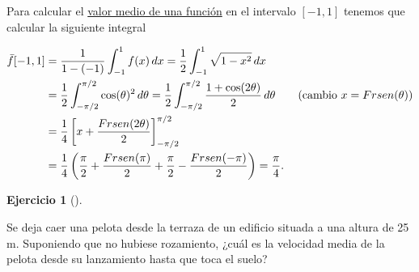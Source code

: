 \documentclass[
  spanish,
  a4paper,
]{scrreport}
\theoremstyle{definition}
\newtheorem{exercise}{Ejercicio}[chapter]
\theoremstyle{remark}
\begin{document}
\begin{tcolorbox}[enhanced jigsaw, arc=.35mm, bottomrule=.15mm, bottomtitle=1mm, breakable, colback=white, colbacktitle=quarto-callout-tip-color!10!white, colframe=quarto-callout-tip-color-frame, coltitle=black, left=2mm, leftrule=.75mm, opacityback=0, opacitybacktitle=0.6, rightrule=.15mm, title=\textcolor{quarto-callout-tip-color}{\faLightbulb}\hspace{0.5em}{Solución}, titlerule=0mm, toprule=.15mm, toptitle=1mm]

Para calcular el
\href{https://aprendeconalf.es/analisis-manual/08-integrales.html\#c\%C3\%A1lculo-de-la-media-de-una-funci\%C3\%B3n}{valor
medio de una función} en el intervalo \([-1,1]\) tenemos que calcular la
siguiente integral

\begin{align*}
\bar f[-1,1] 
&= \frac{1}{1-(-1)}\int_{-1}^1 f(x)\,dx 
= \frac{1}{2}\int_{-1}^1 \sqrt{1-x^2}\,dx \\
&= \frac{1}{2}\int_{-\pi/2}^{\pi/2} \cos(\theta)^2\,d\theta  
= \frac{1}{2}\int_{-\pi/2}^{\pi/2} \frac{1+\cos(2\theta)}{2}\,d\theta \tag{cambio $x=\operatorname{sen}(\theta)$} \\
&= \frac{1}{4}\left[x+\frac{\operatorname{sen}(2\theta)}{2}\right]_{-\pi/2}^{\pi/2} \\
&= \frac{1}{4}\left(\frac{\pi}{2}+\frac{\operatorname{sen}(\pi)}{2}+\frac{\pi}{2}-\frac {\operatorname{sen}(-\pi)}{2}\right)
= \frac{\pi}{4}.
\end{align*}

\end{tcolorbox}

\begin{exercise}[]\protect\hypertarget{exr-velocidad-media}{}\label{exr-velocidad-media}

Se deja caer una pelota desde la terraza de un edificio situada a una
altura de 25 m. Suponiendo que no hubiese rozamiento, ¿cuál es la
velocidad media de la pelota desde su lanzamiento hasta que toca el
suelo?

\end{exercise}
\end{document}
